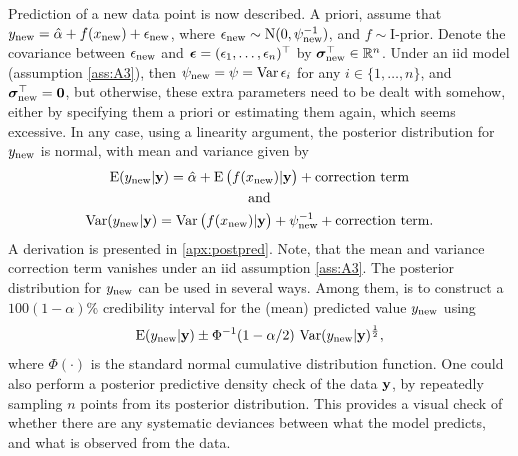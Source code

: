 Prediction of a new data point is now described.
A priori, assume that $y_{\text{new}} = \hat\alpha + f(x_{\text{new}}) + \epsilon_{\text{new}}$, where $\epsilon_{\text{new}} \sim \operatorname{N}(0,\psi^{-1}_{\text{new}})$, and $f\sim \text{I-prior}$.
Denote the covariance between $\epsilon_{\text{new}}$ and ${\bm\epsilon} = (\epsilon_1,\dots,\epsilon_n)^\top$ by ${\bm\sigma}_{\text{new}}^\top \in \mathbb{R}^n$.
Under an iid model (assumption \ref{ass:A3}), then $\psi_{\text{new}} = \psi = \operatorname{Var} \epsilon_i$ for any $i\in\{1,\dots,n\}$, and ${\bm\sigma}_{\text{new}}^\top={\mathbf 0}$, but otherwise, these extra parameters need to be dealt with somehow, either by specifying them a priori or estimating them again, which seems excessive.
In any case, using a linearity argument, the posterior distribution for $y_{\text{new}}$ is normal, with mean and variance given by
\begin{gather}
  \operatorname{E}(y_{\text{new}}|{\mathbf y}) = \hat\alpha + \operatorname{E} \big( f(x_{\text{new}}) |{\mathbf y} \big) + \text{correction term} \\
  \text{and} \nonumber \\
  \operatorname{Var}(y_{\text{new}}|{\mathbf y}) 
  = \operatorname{Var}\big(f(x_{\text{new}})|{\mathbf y}\big) + \psi^{-1}_{\text{new}} + \text{correction term}.
\end{gather}
A derivation is presented in \cref{apx:postpred}.
Note, that the mean and variance correction term vanishes under an iid assumption \ref{ass:A3}.
The posterior distribution for $y_{\text{new}}$ can be used in several ways. 
Among them, is to construct a $100(1 - \alpha)\%$ credibility interval for the (mean) predicted value $y_{\text{new}}$ using
\[
  \operatorname{E}(y_{\text{new}}|{\mathbf y}) \pm \Phi^{-1}(1 - \alpha/2) \, \operatorname{Var}(y_{\text{new}}|{\mathbf y})^{\frac{1}{2}},
\]
where $\Phi(\cdot)$ is the standard normal cumulative distribution function.
One could also perform a posterior predictive density check of the data ${\mathbf y}$, by repeatedly sampling $n$ points from its posterior distribution.
This provides a visual check of whether there are any systematic deviances between what the model predicts, and what is observed from the data.

